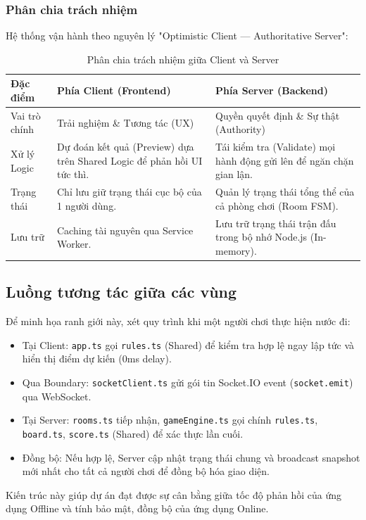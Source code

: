 \newpage

\subsubsection{Phân chia trách nhiệm}

Hệ thống vận hành theo nguyên lý "Optimistic Client — Authoritative Server":

\begin{table}[H]
    \centering
    \renewcommand{\arraystretch}{1.3}
    \setlength{\tabcolsep}{6pt}
    \begin{tabular}{|>{\RaggedRight\arraybackslash}p{2.5cm}|>{\RaggedRight\arraybackslash}p{6.5cm}|>{\RaggedRight\arraybackslash}p{6.5cm}|}
        \hline
        \rowcolor[rgb]{0.8, 0.9, 1.0}
        \textbf{Đặc điểm} & \textbf{Phía Client (Frontend)} & \textbf{Phía Server (Backend)} \\ \hline
        Vai trò chính & Trải nghiệm \& Tương tác (UX) & Quyền quyết định \& Sự thật (Authority) \\ \hline
        Xử lý Logic & Dự đoán kết quả (Preview) dựa trên Shared Logic để phản hồi UI tức thì. & Tái kiểm tra (Validate) mọi hành động gửi lên để ngăn chặn gian lận. \\ \hline
        Trạng thái & Chỉ lưu giữ trạng thái cục bộ của 1 người dùng. & Quản lý trạng thái tổng thể của cả phòng chơi (Room FSM). \\ \hline
        Lưu trữ & Caching tài nguyên qua Service Worker. & Lưu trữ trạng thái trận đấu trong bộ nhớ Node.js (In-memory). \\ \hline
    \end{tabular}
    \caption{Phân chia trách nhiệm giữa Client và Server}
\end{table}
\FloatBarrier

\subsection{Luồng tương tác giữa các vùng}

Để minh họa ranh giới này, xét quy trình khi một người chơi thực hiện nước đi:

\begin{itemize}[topsep=0pt, itemsep=2.5pt, leftmargin=1.5cm]
    \item Tại Client: \texttt{app.ts} gọi \texttt{rules.ts} (Shared) để kiểm tra hợp lệ ngay lập tức và hiển thị điểm dự kiến (0ms delay).
    \item Qua Boundary: \texttt{socketClient.ts} gửi gói tin Socket.IO event (\texttt{socket.emit}) qua WebSocket.
    \item Tại Server: \texttt{rooms.ts} tiếp nhận, \texttt{gameEngine.ts} gọi chính \texttt{rules.ts}, \texttt{board.ts}, \texttt{score.ts} (Shared) để xác thực lần cuối.
    \item Đồng bộ: Nếu hợp lệ, Server cập nhật trạng thái chung và broadcast snapshot mới nhất cho tất cả người chơi để đồng bộ hóa giao diện.
\end{itemize}

Kiến trúc này giúp dự án đạt được sự cân bằng giữa tốc độ phản hồi của ứng dụng Offline và tính bảo mật, đồng bộ của ứng dụng Online.